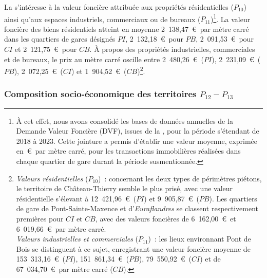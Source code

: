\begin{refsegment}
La  s'intéresse à la valeur foncière attribuée aux propriétés résidentielles (\(P_{10}\)) ainsi qu'aux espaces industriels, commerciaux ou de bureaux (\(P_{11}\))\footnote{
    À cet effet, nous avons consolidé les bases de données annuelles de la Demande Valeur Foncière (DVF), issues de la \textcolor{blue}{\textcite{direction_generale_des_finances_publiques_demandes_2024}}, pour la période s'étendant de 2018 à 2023. Cette jointure a permis d'établir une valeur moyenne, exprimée en~\euro~par mètre carré, pour les transactions immobilières réalisées dans chaque quartier de gare durant la période susmentionnée.
}. La valeur foncière des biens résidentiels atteint en moyenne 2~138,47~\euro~par mètre carré dans les quartiers de gares désignés \(PI\), 2~132,18~\euro~pour \(PB\), 2~091,53~\euro~pour \(CI\) et 2~121,75~\euro~pour \(CB\). À propos des propriétés industrielles, commerciales et de bureaux, le prix au mètre carré oscille entre 2~480,26~\euro~(\(PI\)), 2~231,09~\euro~(\(PB\)), 2~072,25~\euro~(\(CI\)) et 1~904,52~\euro~(\(CB\))\footnote{
    \textsl{Valeurs résidentielles} (\(P_{10}\))~: concernant les deux types de périmètres piétons, le territoire de Château-Thierry semble le plus prisé, avec une valeur résidentielle s'élevant à 12~421,96~\euro~(\(PI\)) et 9~905,87~\euro~(\(PB\)). Les quartiers de gare de Pont-Sainte-Maxence et d'\textsl{Euraflandres} se classent respectivement premières pour \(CI\) et \(CB\), avec des valeurs foncières de 6~162,00~\euro~et 6~019,66~\euro~par mètre carré.
    \\
    \textsl{Valeurs industrielles et commerciales} (\(P_{11}\))~: les lieux environnant Pont de Bois se distinguent à ce sujet, enregistrant une valeur foncière moyenne de 153~313,16~\euro~(\(PI\)), 151~861,34~\euro~(\(PB\)), 79~550,92~\euro~(\(CI\)) et de 67~034,70~\euro~par mètre carré (\(CB\)).
}.%

\subsubsection*{Composition socio-économique des territoires \(P_{12} - P_{13}\)
    \label{chap6:indicateurs-place-sociodemographie}
    }
    

\end{refsegment}
